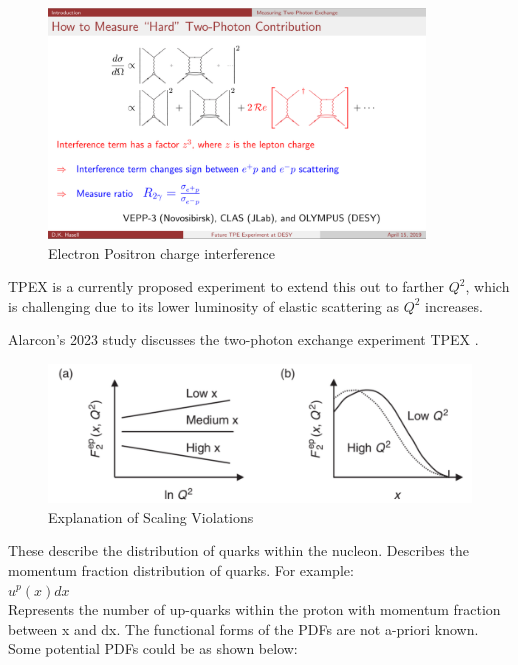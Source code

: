                   
            \begin{figure}[H]
                \centering
                \includegraphics[width=10cm]{Chapters/Ch1-Intro/Ch1-Sec1-Background/pics/elastic-ep/tpex.PNG}
                \caption{Electron Positron charge interference}
            \end{figure}
        
        
            TPEX is a currently proposed experiment to extend this out to farther $Q^2$, which is challenging due to its lower luminosity of elastic scattering as $Q^2$ increases.    

            Alarcon's 2023 study discusses the two-photon exchange experiment TPEX \parencite{Alarcon2023Two-PhotonTPEX}.


           \begin{figure}[H]
            \centering
            \includegraphics[width=12cm]{Chapters/Ch1-Intro/Ch1-Sec1-Background/pics/inelastic-ep/scaling-violations.PNG}
            \caption{Explanation of Scaling Violations}
            \end{figure}
            
    
    
            \indent These describe the distribution of quarks within the nucleon. Describes the momentum fraction distribution of quarks. For example:\\
            \newline
            $u^p(x)dx$\\
            \newline
            Represents the number of up-quarks within the proton with momentum fraction between x and dx. The functional forms of the PDFs are not a-priori known. Some potential PDFs could be as shown below:\\
    
